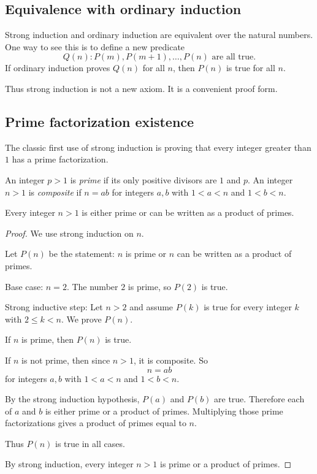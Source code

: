 \subsection{Equivalence with ordinary induction}

Strong induction and ordinary induction are equivalent over the natural numbers. One way to see this is to define a new predicate
\[
Q(n): P(m),P(m+1),\ldots,P(n)\text{ are all true}.
\]
If ordinary induction proves $Q(n)$ for all $n$, then $P(n)$ is true for all $n$.

Thus strong induction is not a new axiom. It is a convenient proof form.

\subsection{Prime factorization existence}

The classic first use of strong induction is proving that every integer greater than $1$ has a prime factorization.

\begin{definition}
An integer $p>1$ is \emph{prime} if its only positive divisors are $1$ and $p$. An integer $n>1$ is \emph{composite} if $n=ab$ for integers $a,b$ with $1<a<n$ and $1<b<n$.
\end{definition}

\begin{theorem}
Every integer $n>1$ is either prime or can be written as a product of primes.
\end{theorem}

\begin{proof}
We use strong induction on $n$.

Let $P(n)$ be the statement: $n$ is prime or $n$ can be written as a product of primes.

Base case: $n=2$. The number $2$ is prime, so $P(2)$ is true.

Strong inductive step: Let $n>2$ and assume $P(k)$ is true for every integer $k$ with $2\leq k<n$. We prove $P(n)$.

If $n$ is prime, then $P(n)$ is true.

If $n$ is not prime, then since $n>1$, it is composite. So
\[
n=ab
\]
for integers $a,b$ with $1<a<n$ and $1<b<n$.

By the strong induction hypothesis, $P(a)$ and $P(b)$ are true. Therefore each of $a$ and $b$ is either prime or a product of primes. Multiplying those prime factorizations gives a product of primes equal to $n$.

Thus $P(n)$ is true in all cases.

By strong induction, every integer $n>1$ is prime or a product of primes.
\end{proof}

